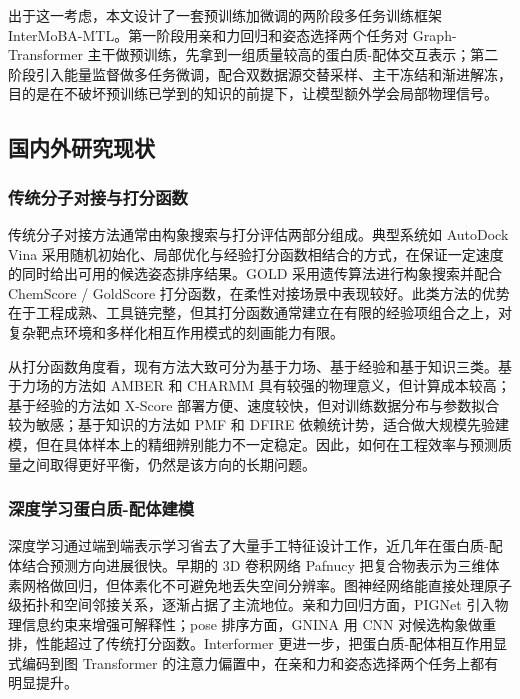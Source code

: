 出于这一考虑，本文设计了一套预训练加微调的两阶段多任务训练框架 InterMoBA-MTL。第一阶段用亲和力回归和姿态选择两个任务对 Graph-Transformer 主干做预训练，先拿到一组质量较高的蛋白质-配体交互表示；第二阶段引入能量监督做多任务微调，配合双数据源交替采样、主干冻结和渐进解冻，目的是在不破坏预训练已学到的知识的前提下，让模型额外学会局部物理信号。

\subsection{国内外研究现状}
\subsubsection{传统分子对接与打分函数}

传统分子对接方法通常由构象搜索与打分评估两部分组成。典型系统如 AutoDock Vina\cite{trott2010autodock} 采用随机初始化、局部优化与经验打分函数相结合的方式，在保证一定速度的同时给出可用的候选姿态排序结果。GOLD\cite{verdonk2003gold} 采用遗传算法进行构象搜索并配合 ChemScore / GoldScore 打分函数，在柔性对接场景中表现较好。此类方法的优势在于工程成熟、工具链完整，但其打分函数通常建立在有限的经验项组合之上，对复杂靶点环境和多样化相互作用模式的刻画能力有限\cite{ginosar2023survey}。

从打分函数角度看，现有方法大致可分为基于力场、基于经验和基于知识三类\cite{trott2010autodock}。基于力场的方法如 AMBER 和 CHARMM 具有较强的物理意义，但计算成本较高；基于经验的方法如 X-Score 部署方便、速度较快，但对训练数据分布与参数拟合较为敏感；基于知识的方法如 PMF 和 DFIRE 依赖统计势，适合做大规模先验建模，但在具体样本上的精细辨别能力不一定稳定。因此，如何在工程效率与预测质量之间取得更好平衡，仍然是该方向的长期问题\cite{tropsha2010best}。

\subsubsection{深度学习蛋白质-配体建模}

深度学习通过端到端表示学习省去了大量手工特征设计工作，近几年在蛋白质-配体结合预测方向进展很快\cite{ginosar2023survey}。早期的 3D 卷积网络 Pafnucy\cite{stepniewska2018pafnucy} 把复合物表示为三维体素网格做回归，但体素化不可避免地丢失空间分辨率。图神经网络能直接处理原子级拓扑和空间邻接关系，逐渐占据了主流地位\cite{gilmer2017neural}。亲和力回归方面，PIGNet\cite{moon2022pignet} 引入物理信息约束来增强可解释性；pose 排序方面，GNINA\cite{mcnutt2021gnina} 用 CNN 对候选构象做重排，性能超过了传统打分函数。Interformer\cite{lai2024interformer} 更进一步，把蛋白质-配体相互作用显式编码到图 Transformer 的注意力偏置中，在亲和力和姿态选择两个任务上都有明显提升。

